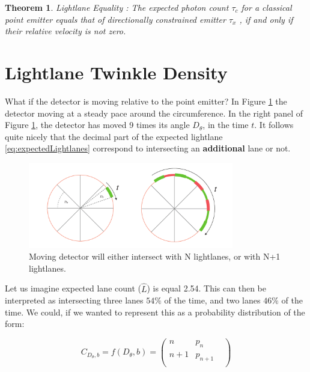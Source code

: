 \documentclass[notitlepage]{article}
\newtheorem{theorem}{Theorem}
\begin{document}
\begin{theorem}
Lightlane Equality : The expected photon count $\tau_c$ for a classical point emitter equals that of directionally constrained emitter $\tau_x$ , if and only if their relative velocity is not zero.
\end{theorem}

\section{Lightlane Twinkle Density}
What if the detector is moving relative to the point emitter? In Figure \ref{fig:MovingDetector} the detector  moving at a steady pace around the circumference. In the right panel of Figure \ref{fig:MovingDetector}, the detector has moved 9 times its angle $D_\theta$, in the time $t$. It follows quite nicely that the decimal part of the expected lightlane  \eqref{eq:expectedLightlanes} correspond to intersecting an \textbf{additional} lane or not. 

\begin{figure}[!ht]
  \centering

 \includegraphics[width=0.8\textwidth, trim={0cm 0cm 0cm 0cm},clip]{Illustrations/Twinkle.pdf}
  \caption{Moving detector will either intersect with N lightlanes, or with N+1 lightlanes. }
    \label{fig:MovingDetector}
\end{figure}

Let us imagine expected lane count ($ \hat{L} $) is equal 2.54. This can then be interpreted as intersecting three lanes $54\%$ of the time, and two lanes $46\%$ of the time. We could, if we wanted to represent this as a probability distribution of the form: 


\begin{equation*}
C_{D_\theta, b} = f(D_\theta, b) = 
\begin{pmatrix}
n & p_n &  \\
n+1 & p_{n+1}\\
\end{pmatrix}
\end{equation*}
\end{document}
